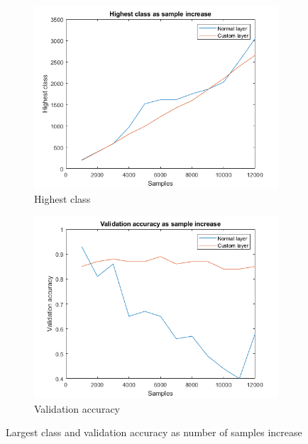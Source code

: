 \begin{figure}
    \centering
    \begin{subfigure}[b]{.49\textwidth}
        \centering
        \includegraphics[width=\textwidth]{figures/firstmax.png}
        \caption{Highest class}
        \label{sfig:ex:extra:firstmax}
    \end{subfigure}
    \hfill
    \begin{subfigure}[b]{.49\textwidth}
        \centering
        \includegraphics[width=\textwidth]{figures/firstres.png}
        \caption{Validation accuracy}
        \label{sfig:ex:extra:firstres}
    \end{subfigure}
    \caption{Largest class and validation accuracy as number of samples increase}
    \label{fig:ex:extra:firstresult}
\end{figure}

